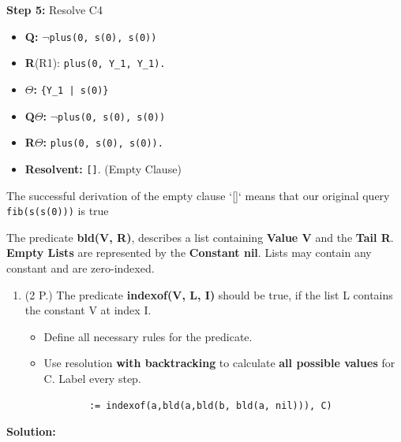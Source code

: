 \documentclass[10pt, a4paper]{article}
\begin{document}
\textbf{Step 5:} Resolve C4 
\begin{itemize}
    \item \textbf{Q:} \texttt{$\lnot$plus(0, s(0), s(0))}
    \item \textbf{R}(R1): \texttt{plus(0, Y\_1, Y\_1).}
    \item \textbf{$\Theta$:} \texttt{\{Y\_1 | s(0)\}}
    \item     \textbf{Q\(\Theta\):}  \texttt{$\lnot$plus(0, s(0), s(0))}
    \item \textbf{R$\Theta$:} \texttt{plus(0, s(0), s(0)).}
    \item \textbf{Resolvent:} \texttt{[]}. (Empty Clause)\\
\end{itemize}

The successful derivation of the empty clause `[]` means  that our original query \texttt{fib(s(s(0)))} is true


\pagebreak
The predicate \textbf{bld(V, R)}, describes a list containing \textbf{Value V} and the \textbf{Tail R}. \textbf{Empty Lists} are represented by the \textbf{Constant nil}. Lists may contain any constant and are zero-indexed.

\begin{enumerate}
    \item (2 P.) The predicate \textbf{indexof({\color{green}V}, {\color{red}L}, {\color{blue}I})} should be true, if the list {\color{red}L} contains the constant {\color{green}V} at index {\color{blue}I}.

    \begin{itemize}
        \item Define all necessary rules for the predicate.
        
        \item Use resolution \textbf{with backtracking} to calculate \textbf{all possible values} for C. Label every step.
        \begin{verbatim}
        := indexof(a,bld(a,bld(b, bld(a, nil))), C)
        \end{verbatim}
    \end{itemize}
\end{enumerate}

\textbf{Solution:}  \\
\end{document}
